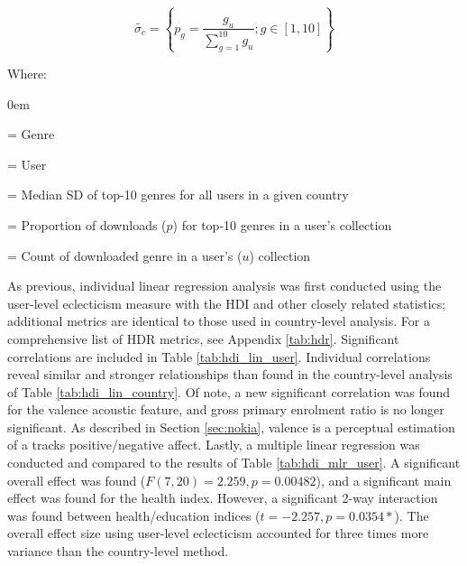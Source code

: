 \documentclass[a4paper]{article}
\begin{document}
\begin{equation}
\tilde{\sigma_c} = \left\{ p_g = \dfrac{g_u}{\sum\limits_{g=1}^{10} g_u}; g \in [1,10]  \right\}
\label{eq:user}
\end{equation}

Where:
\begin{description}\itemsep0em 
\vspace{2em}
\item[$g$] = Genre
\item[$u$] = User
\item[$\tilde{\sigma_c}$] = Median SD of top-10 genres for all users in a given country
\item[$p_g$] = Proportion of downloads ($p$) for top-10 genres in a user's collection
\item[$g_u$] = Count of downloaded genre in a user's ($u$) collection
\end{description}

As previous, individual linear regression analysis was first conducted using the user-level eclecticism measure with the \Gls{HDI} and other closely related statistics; additional metrics are identical to those used in country-level analysis. For a comprehensive list of HDR metrics, see Appendix \ref{tab:hdr}. Significant correlations are included in Table \ref{tab:hdi_lin_user}. Individual correlations reveal similar and stronger relationships than found in the country-level analysis of Table \ref{tab:hdi_lin_country}. Of note, a new significant correlation was found for the valence acoustic feature, and gross primary enrolment ratio is no longer significant. As described in Section \ref{sec:nokia}, valence is a perceptual estimation of a tracks positive/negative affect. Lastly, a multiple linear regression was conducted and compared to the results of Table \ref{tab:hdi_mlr_user}. A significant overall effect was found ($F(7,20) = 2.259, p=0.00482$), and a significant main effect was found for the health index.  However, a significant 2-way interaction was found between health/education indices ($t=-2.257, p=0.0354*$). The overall effect size using user-level eclecticism accounted for three times more variance than the country-level method.
\end{document}
